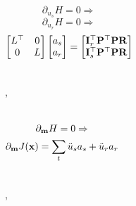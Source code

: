 \begin{frame}
  \begin{columns}
      \vfill
      \[\partial_{u_s} H=0\Rightarrow \]
      \[\partial_{u_r} H=0\Rightarrow \]
      \vfill
    \vfill
    \[
     \begin{bmatrix}
       L^\top & 0          \\
       0      & L
     \end{bmatrix}
     \begin{bmatrix}
       a_s \\ 
       a_r 
     \end{bmatrix}
    =
    \begin{bmatrix}
       {\bf I}^\top_r {\bf P^\top P R} \\ 
       {\bf I}^\top_s {\bf P^\top P R} 
    \end{bmatrix}
    \]
    \vfill
  \end{columns}
  \sep
\end{frame}


\begin{frame}
  \begin{columns}
      \[
        \partial_{{\bf m}} H= 0\Rightarrow 
      \]
      \vfill
      \[
        \partial_{\bf m} J({\bf x})  =  \sum_t \ddot{u}_s a_s +\ddot{u}_r a_r
      \]
  \end{columns}

  \sep
\end{frame}







\begin{frame}
\end{frame}


\begin{frame}
\end{frame} 

\begin{frame}
\end{frame} 

\begin{frame}
\end{frame}

\begin{frame} 
\end{frame}

